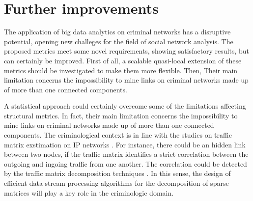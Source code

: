 \section{Further improvements}
\label{sec:further-improvements}

The application of big data analytics on criminal networks has a disruptive potential, opening new challeges for the field of social network analysis.
The proposed metrics meet some novel requirements, showing satisfactory results, but can certainly be improved. 
First of all, a scalable quasi-local extension of these metrics should be investigated to make them more flexible. 
Then, Their main limitation concerns the impossibility to mine links on criminal networks made up of more than one connected components. 

A statistical approach could certainly overcome some of the limitations affecting structural metrics. In fact, their main limitation concerns the impossibility to mine links on criminal networks made up of more than one connected components.  
The criminological context is in line with the studies on traffic matrix exstimation on IP networks  \cite{medina2002traffic,benameur2004traffic,papagiannaki2004distributed}. 
For instance, there could be an hidden link between two nodes, if the traffic matrix identifies a strict correlation between the outgoing and ingoing traffic from one another. 
The correlation could be detected by the traffic matrix decomposition techniques \cite{elgamal2015analysis,jiang2015covariance}. 
In this sense, the design of efficient data stream processing algorithms for the decomposition of sparse matrices will play a key role in the criminologic domain.